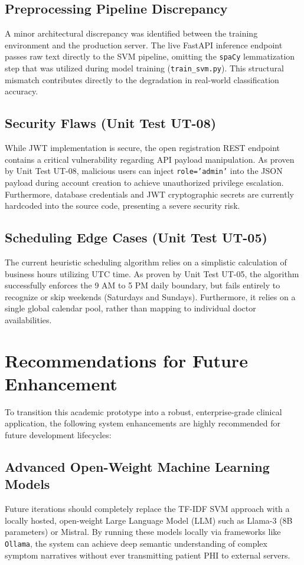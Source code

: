 \documentclass[12pt,a4paper]{report}
\begin{document}
\subsection{Preprocessing Pipeline Discrepancy}
A minor architectural discrepancy was identified between the training environment and the production server. The live FastAPI inference endpoint passes raw text directly to the SVM pipeline, omitting the \texttt{spaCy} lemmatization step that was utilized during model training (\texttt{train\_svm.py}). This structural mismatch contributes directly to the degradation in real-world classification accuracy.

\subsection{Security Flaws (Unit Test UT-08)}
While JWT implementation is secure, the open registration REST endpoint contains a critical vulnerability regarding API payload manipulation. As proven by Unit Test UT-08, malicious users can inject \texttt{role='admin'} into the JSON payload during account creation to achieve unauthorized privilege escalation. Furthermore, database credentials and JWT cryptographic secrets are currently hardcoded into the source code, presenting a severe security risk.

\subsection{Scheduling Edge Cases (Unit Test UT-05)}
The current heuristic scheduling algorithm relies on a simplistic calculation of business hours utilizing UTC time. As proven by Unit Test UT-05, the algorithm successfully enforces the 9 AM to 5 PM daily boundary, but fails entirely to recognize or skip weekends (Saturdays and Sundays). Furthermore, it relies on a single global calendar pool, rather than mapping to individual doctor availabilities.

\section{Recommendations for Future Enhancement}
To transition this academic prototype into a robust, enterprise-grade clinical application, the following system enhancements are highly recommended for future development lifecycles:

\subsection{Advanced Open-Weight Machine Learning Models}
Future iterations should completely replace the TF-IDF SVM approach with a locally hosted, open-weight Large Language Model (LLM) such as Llama-3 (8B parameters) or Mistral. By running these models locally via frameworks like \texttt{Ollama}, the system can achieve deep semantic understanding of complex symptom narratives without ever transmitting patient PHI to external servers.
\end{document}
